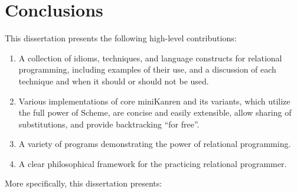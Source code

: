 \chapter{Conclusions}\label{conclusionchapter}

This dissertation presents the following high-level contributions:

\begin{enumerate}
\item A collection of idioms, techniques, and language constructs for
  relational programming, including examples of their use, and a
  discussion of each technique and when it should or should not be
  used.

\item Various implementations of core miniKanren and its variants,
which utilize the full power of Scheme, are concise and easily
extensible, allow sharing of substitutions, and provide backtracking
``for free''.

\item A variety of programs demonstrating the power of relational programming.

\item A clear philosophical framework for the practicing relational
programmer.
\end{enumerate}

\noindent More specifically, this dissertation presents:

